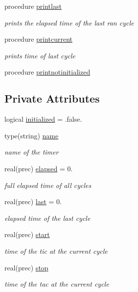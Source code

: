 \begin{DoxyCompactItemize}
procedure \mbox{\hyperlink{structsimulationtimer__mod_1_1timer__class_a1ac8844fe0766c418d301064155d9cc9}{printlast}}
\begin{DoxyCompactList}\small\item\em prints the elapsed time of the last ran cycle \end{DoxyCompactList}\item 
procedure \mbox{\hyperlink{structsimulationtimer__mod_1_1timer__class_ae7896d93f60b31af526f91adc324a641}{printcurrent}}
\begin{DoxyCompactList}\small\item\em prints time of last cycle \end{DoxyCompactList}\item 
procedure \mbox{\hyperlink{structsimulationtimer__mod_1_1timer__class_a559692fe52fabf6a4f5078b03ed08620}{printnotinitialized}}
\end{DoxyCompactItemize}
\subsection*{Private Attributes}
\begin{DoxyCompactItemize}
\item 
logical \mbox{\hyperlink{structsimulationtimer__mod_1_1timer__class_a9252b5815eda23bfb60fda8d24265455}{initialized}} = .false.
\item 
type(string) \mbox{\hyperlink{structsimulationtimer__mod_1_1timer__class_aa9021f130f1ff4431ce394e38cea3ac1}{name}}
\begin{DoxyCompactList}\small\item\em name of the timer \end{DoxyCompactList}\item 
real(prec) \mbox{\hyperlink{structsimulationtimer__mod_1_1timer__class_a17d19848f82f69a33cecb52829992d06}{elapsed}} = 0.
\begin{DoxyCompactList}\small\item\em full elapsed time of all cycles \end{DoxyCompactList}\item 
real(prec) \mbox{\hyperlink{structsimulationtimer__mod_1_1timer__class_a6dadb87043528a52de8e2571400a84e5}{last}} = 0.
\begin{DoxyCompactList}\small\item\em elapsed time of the last cycle \end{DoxyCompactList}\item 
real(prec) \mbox{\hyperlink{structsimulationtimer__mod_1_1timer__class_ad61018be29f7e3ac5ecfa6b2d068e581}{start}}
\begin{DoxyCompactList}\small\item\em time of the tic at the current cycle \end{DoxyCompactList}\item 
real(prec) \mbox{\hyperlink{structsimulationtimer__mod_1_1timer__class_a96b9fcb1a8e2ae20422e274a025b290d}{stop}}
\begin{DoxyCompactList}\small\item\em time of the tac at the current cycle \end{DoxyCompactList}\end{DoxyCompactItemize}


